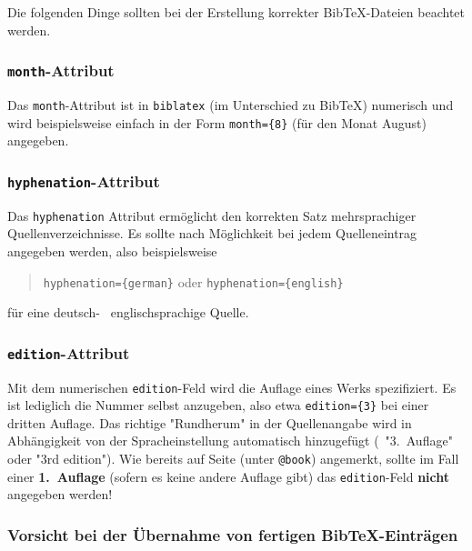 Die folgenden Dinge sollten bei der Erstellung korrekter BibTeX-Dateien beachtet werden.

\subsubsection{\texttt{month}-Attribut}

Das \texttt{month}-Attribut ist in \texttt{biblatex} (im Unterschied zu BibTeX) numerisch
und wird beispielsweise einfach in der Form \verb!month={8}! (für den Monat August)
angegeben.


\subsubsection{\texttt{hyphenation}-Attribut}

Das \texttt{hyphenation} Attribut ermöglicht den korrekten Satz mehrsprachiger Quellenverzeichnisse. 
Es sollte nach Möglichkeit bei jedem Quelleneintrag angegeben werden, also beispielsweise
\begin{quote}
\verb!hyphenation={german}! \quad oder \quad \verb!hyphenation={english}!
\end{quote}
für eine deutsch- \bzw\ englischsprachige Quelle.


\subsubsection{\texttt{edition}-Attribut}

Mit dem numerischen \texttt{edition}-Feld wird die Auflage eines Werks spezifiziert.
Es ist lediglich die Nummer selbst anzugeben, also etwa
\verb!edition={3}!
bei einer dritten Auflage. Das richtige "Rundherum" in der Quellenangabe wird 
in Abhängigkeit von der Spracheinstellung automatisch hinzugefügt 
(\zB\ "3.\ Auflage" oder "3rd edition").
%
Wie bereits auf Seite \pageref{sec:@book} (unter \texttt{@book}) angemerkt, sollte im Fall einer
\textbf{1.~Auflage} (sofern es keine andere Auflage gibt) das \texttt{edition}-Feld \textbf{nicht} 
angegeben werden!


\subsubsection{Vorsicht bei der Übernahme von fertigen BibTeX-Einträgen}

